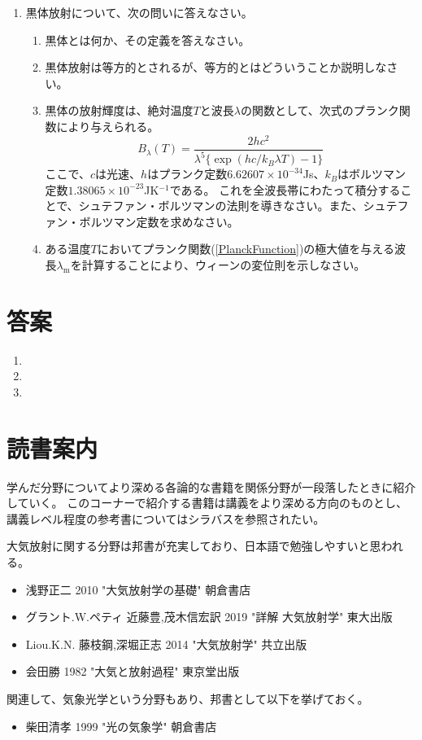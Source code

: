 \documentclass{jsarticle}
\newenvironment{problems}
{
  \renewcommand\labelenumi{\doublebox{\arabic{enumi}}}
  \begin{enumerate}
}{
  \end{enumerate}
  \renewcommand\labelenumi{\arabic{enumi}.}
}
\begin{document}
\begin{problems}
    \item 黒体放射について、次の問いに答えなさい。
        \begin{enumerate}[(1)]
        \item 黒体とは何か、その定義を答えなさい。
        \item 黒体放射は等方的とされるが、等方的とはどういうことか説明しなさい。
        \item 黒体の放射輝度は、絶対温度$T$と波長$\lambda$の関数として、次式のプランク関数により与えられる。
        \begin{equation}
        B_{\lambda}(T)=\frac{2hc^2}{\lambda^5\{\exp(hc/k_B\lambda T)-1\}} \label{PlanckFunction}
        \end{equation}
        ここで、$c$は光速、$h$はプランク定数$6.62607\times 10^{-34}$Js、$k_B$はボルツマン定数$1.38065\times 10^{-23}$JK$^{-1}$である。
        これを全波長帯にわたって積分することで、シュテファン・ボルツマンの法則を導きなさい。また、シュテファン・ボルツマン定数を求めなさい。
        \item ある温度$T$においてプランク関数(\ref{PlanckFunction})の極大値を与える波長$\lambda _\mathrm{m}$を計算することにより、ウィーンの変位則を示しなさい。
        \end{enumerate}
\end{problems}

\section{答案}
\begin{problems}
\item 

\item 

\item 

\end{problems}

\section{読書案内}
学んだ分野についてより深める各論的な書籍を関係分野が一段落したときに紹介していく。
このコーナーで紹介する書籍は講義をより深める方向のものとし、講義レベル程度の参考書についてはシラバスを参照されたい。

大気放射に関する分野は邦書が充実しており、日本語で勉強しやすいと思われる。
\begin{itemize}
\item 浅野正二 2010 "大気放射学の基礎" 朝倉書店
\item グラント.W.ペティ 近藤豊,茂木信宏訳 2019 "詳解 大気放射学" 東大出版
\item Liou.K.N. 藤枝鋼,深堀正志 2014 "大気放射学" 共立出版
\item 会田勝 1982 "大気と放射過程" 東京堂出版
\end{itemize}

関連して、気象光学という分野もあり、邦書として以下を挙げておく。
\begin{itemize}
\item 柴田清孝 1999 "光の気象学" 朝倉書店
\end{itemize}
\end{document}
